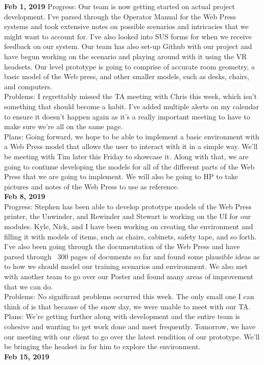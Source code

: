 \textbf{Feb 1, 2019}
Progress: 	Our team is now getting started on actual project development. I've parsed through the Operator Manual for the Web Press systems and took extensive notes on possible scenarios and intricacies that we might want to account for. I've also looked into SUS forms for when we receive feedback on our system. Our team has also set-up Github with our project and have begun working on the scenario and playing around with it using the VR headsets. Our level prototype is going to comprise of accurate room geometry, a basic model of the Web press, and other smaller models, such as desks, chairs, and computers.\\
Problems: 	I regrettably missed the TA meeting with Chris this week, which isn't something that should become a habit. I've added multiple alerts on my calendar to ensure it doesn't happen again as it's a really important meeting to have to make sure we're all on the same page.\\
Plans: 	Going forward, we hope to be able to implement a basic environment with a Web Press model that allows the user to interact with it in a simple way. We'll be meeting with Tim later this Friday to showcase it. Along with that, we are going to continue developing the models for all of the different parts of the Web Press that we are going to implement. We will also be going to HP to take pictures and notes of the Web Press to use as reference.
\\
\textbf{Feb 8, 2019}\\
Progress: 	Stephen has been able to develop prototype models of the Web Press printer, the Unwinder, and Rewinder and Stewart is working on the UI for our modules. Kyle, Nick, and I have been working on creating the environment and filling it with models of items, such as chairs, cabinets, safety tape, and so forth. I've also been going through the documentation of the Web Press and have parsed through ~300 pages of documents so far and found some plausible ideas as to how we should model our training scenarios and environment. We also met with another team to go over our Poster and found many areas of improvement that we can do.\\
Problems: 	No significant problems occurred this week. The only small one I can think of is that because of the snow day, we were unable to meet with our TA. \\
Plans: 	We're getting further along with development and the entire team is cohesive and wanting to get work done and meet frequently. Tomorrow, we have our meeting with our client to go over the latest rendition of our prototype. We'll be bringing the headset in for him to explore the environment. \\
\textbf{Feb 15, 2019}\\


